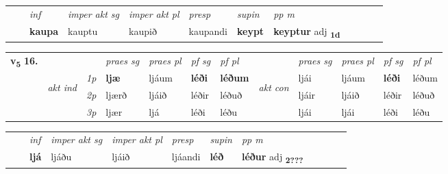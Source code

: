 \begin{tabular}{llllllllllll}
 & & \textit{inf} & \textit{imper akt sg} & \textit{imper akt pl}   & \textit{presp} & \textit{supin}  & \textit{pp m}     \\*
  & & \textbf{kaupa} & kauptu  & kaupið   & kaupandi &  \textbf{keypt}  & \textbf{keyptur} adj \textbf{\textsubscript{1d}} \\*
\cmidrule{1-12}
\end{tabular}



\begin{tabular}{llllllllllll} \toprule
\multirow{4}{*}{{{\textbf{v{\textsubscript{5}}} \Large{\textbf{16.}}}}}  & &   &  \textit{praes sg}  & \textit{praes pl}  &\textit{ pf sg} & \textit{pf pl} &  &  \textit{praes sg}  & \textit{praes pl}  & \textit{pf sg} & \textit{pf pl } \\*
	\cmidrule{4-7} \cmidrule{9-12}
 & \multirow{3}{*}{\begin{turn}{90}\textit{akt ind}\end{turn}} & {\textit{1p}} & \textbf{ljæ} & ljáum    & \textbf{léði} & \textbf{léðum} & \multirow{3}{*}{\begin{turn}{90}\textit{akt con}\end{turn}} &ljái & ljáum & \textbf{léði} & léðum\\*
& &  {\textit{2p}} &  ljærð  & ljáið   & léðir & léðuð & & ljáir & ljáið & léðir & léðuð \\*
& &  {\textit{3p}} & ljær & ljá   & léði & léðu & & ljái & ljái& léði & léðu  \\*
\cmidrule{4-7} \cmidrule{9-12}
\end{tabular}


\begin{tabular}{llllllllllll}
 & & \textit{inf} & \textit{imper akt sg} & \textit{imper akt pl}   & \textit{presp} & \textit{supin}  & \textit{pp m}     \\*
  & & \textbf{ljá} & ljáðu  & ljáið   & ljáandi &  \textbf{léð}  & \textbf{léður} adj \textbf{\textsubscript{2???}} \\*
\cmidrule{1-12}
\end{tabular}



